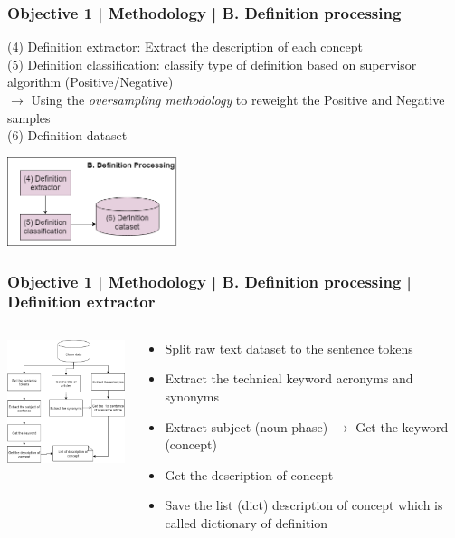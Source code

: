 \documentclass{beamer}
\begin{document}
\begin{frame}
\frametitle{Objective 1 | Methodology | B. Definition processing}
(4) Definition extractor: Extract the description of each concept\\
(5) Definition classification: classify type of definition based on supervisor algorithm (Positive/Negative)\\
$\rightarrow$ Using the \textit{oversampling methodology} to reweight the Positive and Negative samples\\
(6) Definition dataset
\begin{center}
		\includegraphics[width=50mm]{223.png}
\end{center}
\end{frame}
\begin{frame}
\frametitle{Objective 1 | Methodology | B. Definition processing | Definition extractor}
\begin{columns}
		\begin{column}{.5\textwidth}
		\includegraphics[width=50mm]{df00.png}
	\end{column}
	\begin{column}{.65\textwidth}
		
		\begin{itemize}
			\item Split raw text dataset to the sentence tokens
			\item Extract the technical keyword acronyms and synonyms
			\item Extract subject (noun phase) $\rightarrow$ Get the keyword (concept)

			\item Get the description of concept
			\item Save the list (dict) description of concept which is called dictionary of definition
		\end{itemize}
	\end{column}

	
\end{columns}
\end{frame}
\end{document}

